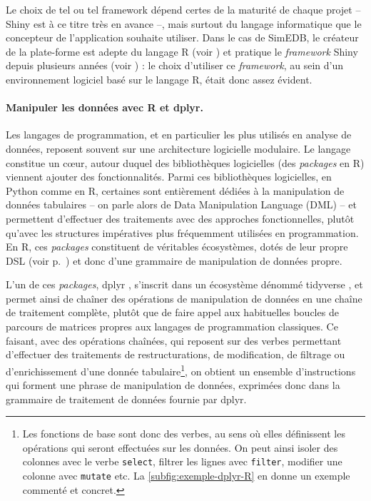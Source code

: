 Le choix de tel ou tel framework dépend certes de la maturité de chaque projet -- \textsf{Shiny} est à ce titre très en avance --, mais surtout du langage informatique que le concepteur de l'application souhaite utiliser.
Dans le cas de SimEDB, le créateur de la plate-forme est adepte du langage \textsf{R} (voir \cite{commenges_r_2014}) et pratique le \textit{framework} \textsf{Shiny} depuis plusieurs années (voir \cite{cura_creer_2015}) : le choix d'utiliser ce \textit{framework}, au sein d'un environnement logiciel basé sur le langage \textsf{R}, était donc assez évident.


\paragraph{Manipuler les données avec \textsf{R} et \textsf{dplyr}.}

Les langages de programmation, et en particulier les plus utilisés en analyse de données, reposent souvent sur une architecture logicielle modulaire.
Le langage constitue un cœur, autour duquel des bibliothèques logicielles (des \textit{packages} en \textsf{R}) viennent ajouter des fonctionnalités.
Parmi ces bibliothèques logicielles, en Python comme en R, certaines sont entièrement dédiées à la manipulation de données tabulaires -- on parle alors de \og Data Manipulation Language\fg{} (DML) -- et permettent d'effectuer des traitements avec des approches fonctionnelles, plutôt qu'avec les structures impératives plus fréquemment utilisées en programmation.
En \textsf{R}, ces \textit{packages} constituent de véritables écosystèmes, dotés de leur propre DSL (voir p.~\pageref{par:DSL}) et donc d'une grammaire de manipulation de données propre.

L'un de ces \textit{packages}, \textsf{dplyr} \autocite{wickham_dplyr_2015}, s'inscrit dans un écosystème dénommé \textsf{tidyverse} \autocite{wickham_tidyverse_2017}, et permet ainsi de chaîner des opérations de manipulation de données en une chaîne de traitement complète, plutôt que de faire appel aux habituelles boucles de parcours de matrices propres aux langages de programmation classiques.
Ce faisant, avec des opérations chaînées, qui reposent sur des \og verbes\fg{} permettant d'effectuer des traitements de restructurations, de modification, de filtrage ou d'enrichissement d'une donnée tabulaire\footnote{
	Les fonctions de base sont donc des \og verbes\fg{}, au sens où elles définissent les opérations qui seront effectuées sur les données.
	On peut ainsi isoler des colonnes avec le \og verbe\fg{} \texttt{select}, filtrer les lignes avec \texttt{filter}, modifier une colonne avec \texttt{mutate} etc.
	La \cref{subfig:exemple-dplyr-R} en donne un exemple commenté et concret.
}, on obtient un ensemble d'instructions qui forment une \og phrase\fg{} de manipulation de données, exprimées donc dans la \og grammaire de traitement de données\fg{} fournie par \textsf{dplyr}.

